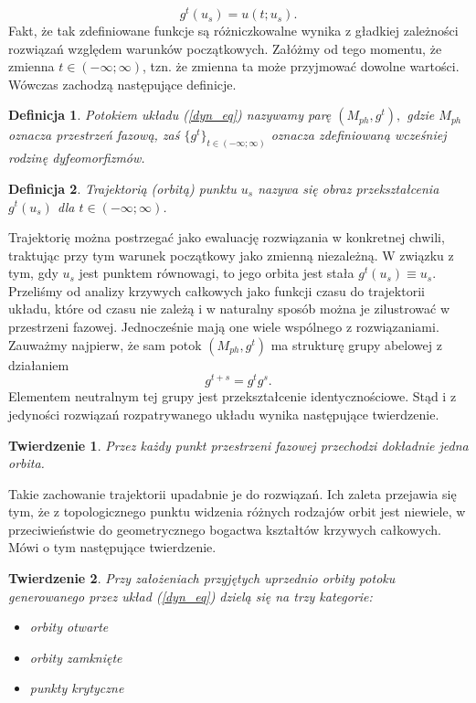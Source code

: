 \documentclass[12pt]{article}
\newtheorem{defi}{Definicja}
\newtheorem{tw}{Twierdzenie}
\begin{document}
\begin{equation}
	g^t(u_{s}) = u(t;u_{s}).
\end{equation}
Fakt, że tak zdefiniowane funkcje są różniczkowalne wynika z gładkiej zależności rozwiązań względem warunków początkowych. Załóżmy od tego momentu, że zmienna $ t \in (-\infty;\infty) $, tzn. że zmienna ta może przyjmować dowolne wartości. Wówczas zachodzą następujące definicje.
\begin{defi}
	Potokiem układu (\ref{dyn_eq}) nazywamy parę $ (M_{ph},g^t), $ gdzie $ M_{ph} $ oznacza przestrzeń fazową, zaś $ \{g^t\}_{t\in(-\infty;\infty)} $ oznacza zdefiniowaną wcześniej rodzinę dyfeomorfizmów.
\end{defi}
\begin{defi}
	Trajektorią (orbitą) punktu $ u_{s} $ nazywa się obraz przekształcenia $ g^t(u_{s}) $ dla $t\in(-\infty;\infty)  $.
\end{defi}
Trajektorię można postrzegać jako ewaluację rozwiązania w konkretnej chwili, traktując przy tym warunek początkowy jako zmienną niezależną. W związku z tym, gdy $ u_{s} $ jest punktem równowagi, to jego orbita jest stała $ g^t(u_{s}) \equiv u_{s}. $\newline
Przeliśmy od analizy krzywych całkowych jako funkcji czasu do trajektorii układu, które od czasu nie zależą i w naturalny sposób można je zilustrować w przestrzeni fazowej. Jednocześnie mają one wiele wspólnego z rozwiązaniami. Zauważmy najpierw, że sam potok $ (M_{ph},g^t) $ ma strukturę grupy abelowej z działaniem
\begin{equation}
g^{t+s} = g^tg^s.
\end{equation}
Elementem neutralnym tej grupy jest przekształcenie identycznościowe. Stąd i z jedyności rozwiązań rozpatrywanego układu wynika następujące twierdzenie.
\begin{tw}
	Przez każdy punkt przestrzeni fazowej przechodzi dokładnie jedna orbita.
\end{tw}
Takie zachowanie trajektorii upadabnie je do rozwiązań. Ich zaleta przejawia się tym, że z topologicznego punktu widzenia różnych rodzajów orbit jest niewiele, w przeciwieństwie do geometrycznego bogactwa kształtów krzywych całkowych. Mówi o tym następujące twierdzenie.
\begin{tw}
	Przy założeniach przyjętych uprzednio orbity potoku generowanego przez układ (\ref{dyn_eq}) dzielą się na trzy kategorie:
	\begin{itemize}
		\item orbity otwarte
		\item orbity zamknięte
		\item punkty krytyczne
	\end{itemize}
\end{tw}
\end{document}
